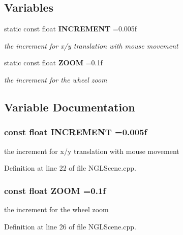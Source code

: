 \subsection*{Variables}
\begin{DoxyCompactItemize}
\item 
static const float {\bf I\-N\-C\-R\-E\-M\-E\-N\-T} =0.\-005f
\begin{DoxyCompactList}\small\item\em the increment for x/y translation with mouse movement \end{DoxyCompactList}\item 
static const float {\bf Z\-O\-O\-M} =0.\-1f
\begin{DoxyCompactList}\small\item\em the increment for the wheel zoom \end{DoxyCompactList}\end{DoxyCompactItemize}


\subsection{Variable Documentation}
\subsubsection[{I\-N\-C\-R\-E\-M\-E\-N\-T}]{\setlength{\rightskip}{0pt plus 5cm}const float I\-N\-C\-R\-E\-M\-E\-N\-T =0.\-005f\hspace{0.3cm}{\ttfamily [static]}}\label{_n_g_l_scene_8cpp_a1e7bfa770ab6ff97ddeda9d97a5bd527}


the increment for x/y translation with mouse movement 



Definition at line 22 of file N\-G\-L\-Scene.\-cpp.

\subsubsection[{Z\-O\-O\-M}]{\setlength{\rightskip}{0pt plus 5cm}const float Z\-O\-O\-M =0.\-1f\hspace{0.3cm}{\ttfamily [static]}}\label{_n_g_l_scene_8cpp_ad53f4ea4bad2000e469a9b538c39878f}


the increment for the wheel zoom 



Definition at line 26 of file N\-G\-L\-Scene.\-cpp.

